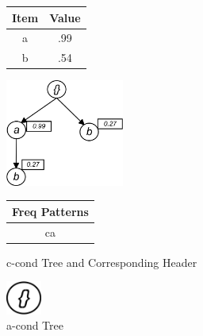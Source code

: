 \begin{figure}
\begin{minipage}{0.30\textwidth}
  \centering
	\begin{center}
	\begin{tabular}{ |c|c| } 
 	\hline
 		Item&Value\\ \hline\hline
 		a &  .99  	\\ \hline
 		b &  .54   	\\ \hline
\end{tabular}
\end{center}  
\end{minipage}
  \hfill
\begin{minipage}{0.29\textwidth}
  \centering
  \hfill
  \includegraphics[width=.8\textwidth, height=3.5cm]{images/C_COND.jpg}
  \hfill  
\end{minipage}
\hfill
\begin{minipage}{0.30\textwidth}
  \centering  
	\begin{center}
	\begin{tabular}{ |c| } 
 	\hline
 		Freq Patterns \\ \hline\hline
 		ca  	\\ \hline
 		
\end{tabular}
\end{center}   
\end{minipage}
\caption{c-cond Tree and Corresponding Header}
\label{figure:c_cond}
\end{figure}
\begin{figure}
\centering
  \includegraphics[width=.10\textwidth, height=1.1cm]{images/A_COND.jpg}
\caption{a-cond Tree}
\label{figure:a_cond}
\end{figure}

%
